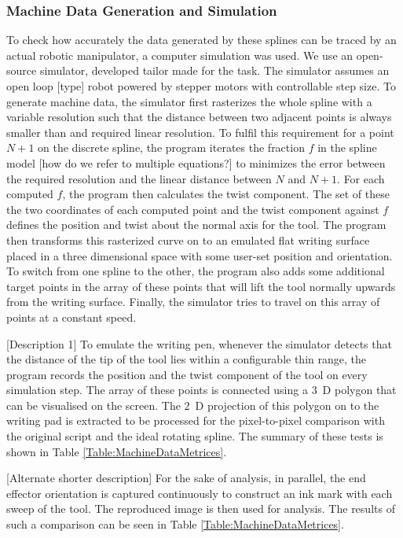 \subsubsection{Machine Data Generation and Simulation}
    To check how accurately the data generated by these splines can be traced by an actual robotic manipulator, a computer simulation was used. We use an open-source simulator, developed  tailor made for the task. The simulator assumes an open loop [type] robot powered by stepper motors with controllable step size. To generate machine data, the simulator first rasterizes the whole spline with a variable resolution such that the distance between two adjacent points is always smaller than and required linear resolution. To fulfil this requirement for a point $N + 1$ on the discrete spline, the program iterates the fraction $f$ in the spline model [how do we refer to multiple equations?] to minimizes the error between the required resolution and the linear distance between $N$ and $N + 1$. For each computed $f$, the program then calculates the twist component. The set of these the two coordinates of each computed point and the twist component against $f$ defines the position and twist about the normal axis for the tool. The program then transforms this rasterized curve on to an emulated flat writing surface placed in a three dimensional space with some user-set position and orientation. To switch from one spline to the other, the program also adds some additional target points in the array of these points that will lift the tool normally upwards from the writing surface. Finally, the simulator tries to travel on this array of points at a constant speed.

    [Description 1]
    To emulate the writing pen, whenever the simulator detects that the distance of the tip of the tool lies within a configurable thin range, the program records the position and the twist component of the tool on every simulation step. The array of these points is connected using a $3$~D polygon that can be visualised on the screen. The $2$~D projection of this polygon on to the writing pad is extracted to be processed for the pixel-to-pixel comparison with the original script and the ideal rotating spline. The summary of these tests is shown in Table \ref{Table:MachineDataMetrices}.

    [Alternate shorter description]
    For the sake of analysis, in parallel, the end effector orientation is captured continuously to construct an ink mark with each sweep of the tool. The reproduced image is then used for analysis. The results of such a comparison can be seen in Table \ref{Table:MachineDataMetrices}.

